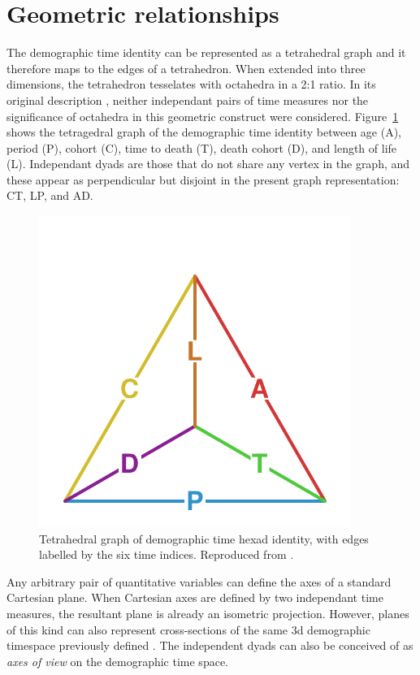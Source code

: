 \section{Geometric relationships}
The demographic time identity can be represented as a tetrahedral graph and it therefore maps to the edges of a tetrahedron. When extended into three dimensions, the tetrahedron tesselates with octahedra in a 2:1 ratio. In its original description \citep{riffe2017demographictime}, neither independant pairs of time measures nor the significance of octahedra in this geometric construct were considered. Figure~\ref{fig:tet} shows the tetragedral graph of the demographic time identity between age (A), period (P), cohort (C), time to death (T), death cohort (D), and length of life (L). Independant dyads are those that do not share any vertex in the graph, and these appear as perpendicular but disjoint in the present graph representation: CT, LP, and AD.

\begin{figure}[h!]
\centering
\caption{Tetrahedral graph of demographic time hexad identity, with edges
labelled by the six time indices. Reproduced from 
\citet{riffe2017demographictime}.}
\label{fig:tet}
\includegraphics[width=4in]{Figures/TetraHedronEdgesOnly.pdf}%
\end{figure}

Any arbitrary pair of quantitative variables can define the axes of a standard Cartesian plane. When Cartesian axes are defined by two independant time measures, the resultant plane is already an isometric projection. However, planes of this kind can also represent cross-sections of the same 3d demographic timespace previously defined \citep{riffe2017demographictime}. The independent dyads can also be conceived of as \emph{axes of view} on the demographic time space.

